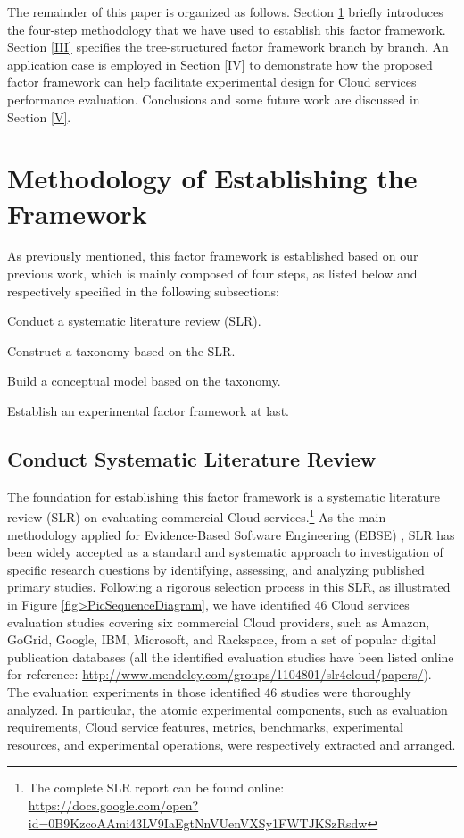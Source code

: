 \documentclass[10pt, conference, compsocconf]{IEEEtran}
\begin{document}
The remainder of this paper is organized as follows. Section \ref{II} briefly introduces the four-step methodology that we have used to establish this factor framework. Section \ref{III} specifies the tree-structured factor framework branch by branch. An application case is employed in Section \ref{IV} to demonstrate how the proposed factor framework can help facilitate experimental design for Cloud services performance evaluation. Conclusions and some future work are discussed in Section \ref{V}.

\section{Methodology of Establishing the Framework}
\label{II}
As previously mentioned, this factor framework is established based on our previous work, which is mainly composed of four steps, as listed below and respectively specified in the following subsections:
\begin{itemize*}
    \item	Conduct a systematic literature review (SLR).
    \item	Construct a taxonomy based on the SLR.
    \item	Build a conceptual model based on the taxonomy.
    \item	Establish an experimental factor framework at last.
\end{itemize*}

\subsection{Conduct Systematic Literature Review}
The foundation for establishing this factor framework is a systematic literature review (SLR) on evaluating commercial Cloud services.\footnote{The complete SLR report can be found online: \url{https://docs.google.com/open?id=0B9KzcoAAmi43LV9IaEgtNnVUenVXSy1FWTJKSzRsdw}} As the main methodology applied for Evidence-Based Software Engineering (EBSE) \cite{Dyba_Kitchenham_2005}, SLR has been widely accepted as a standard and systematic approach to investigation of specific research questions by identifying, assessing, and analyzing published primary studies. Following a rigorous selection process in this SLR, as illustrated in Figure \ref{fig>PicSequenceDiagram}, we have identified 46 Cloud services evaluation studies covering six commercial Cloud providers, such as Amazon, GoGrid, Google, IBM, Microsoft, and Rackspace, from a set of popular digital publication databases (all the identified evaluation studies have been listed online for reference: \url{http://www.mendeley.com/groups/1104801/slr4cloud/papers/}). The evaluation experiments in those identified 46 studies were thoroughly analyzed. In particular, the atomic experimental components, such as evaluation requirements, Cloud service features, metrics, benchmarks, experimental resources, and experimental operations, were respectively extracted and arranged. 
\end{document}

